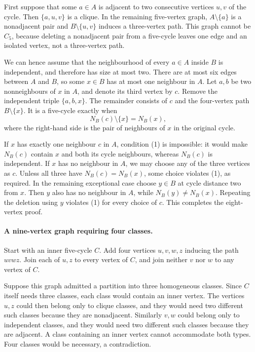 First suppose that some \(a\in A\) is adjacent to two consecutive vertices \(u,v\) of the cycle. Then \(\{a,u,v\}\) is a clique. In the remaining five-vertex graph, \(A\setminus\{a\}\) is a nonadjacent pair and \(B\setminus\{u,v\}\) induces a three-vertex path. This graph cannot be \(C_5\), because deleting a nonadjacent pair from a five-cycle leaves one edge and an isolated vertex, not a three-vertex path.

We can hence assume that the neighbourhood of every \(a\in A\) inside \(B\) is independent, and therefore has size at most two. There are at most six edges between \(A\) and \(B\), so some \(x\in B\) has at most one neighbour in \(A\). Let \(a,b\) be two nonneighbours of \(x\) in \(A\), and denote its third vertex by \(c\). Remove the independent triple \(\{a,b,x\}\). The remainder consists of \(c\) and the four-vertex path \(B\setminus\{x\}\). It is a five-cycle exactly when
\[
 N_B(c)\setminus\{x\}=N_B(x), \tag{1}
\]
where the right-hand side is the pair of neighbours of \(x\) in the original cycle.

If \(x\) has exactly one neighbour \(c\) in \(A\), condition (1) is impossible: it would make \(N_B(c)\) contain \(x\) and both its cycle neighbours, whereas \(N_B(c)\) is independent. If \(x\) has no neighbour in \(A\), we may choose any of the three vertices as \(c\). Unless all three have \(N_B(c)=N_B(x)\), some choice violates (1), as required. In the remaining exceptional case choose \(y\in B\) at cycle distance two from \(x\). Then \(y\) also has no neighbour in \(A\), while \(N_B(y)\ne N_B(x)\). Repeating the deletion using \(y\) violates (1) for every choice of \(c\). This completes the eight-vertex proof.

\paragraph{A nine-vertex graph requiring four classes.}
Start with an inner five-cycle \(C\). Add four vertices \(u,v,w,z\) inducing the path \(u v w z\). Join each of \(u,z\) to every vertex of \(C\), and join neither \(v\) nor \(w\) to any vertex of \(C\).

Suppose this graph admitted a partition into three homogeneous classes. Since \(C\) itself needs three classes, each class would contain an inner vertex. The vertices \(u,z\) could then belong only to clique classes, and they would need two different such classes because they are nonadjacent. Similarly \(v,w\) could belong only to independent classes, and they would need two different such classes because they are adjacent. A class containing an inner vertex cannot accommodate both types. Four classes would be necessary, a contradiction.

